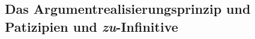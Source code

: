 {%


\subsection{Das Argumentrealisierungsprinzip und Patizipien und \emph{zu}-Infinitive}
\label{sec-ARP-und-Partizipien}

}
